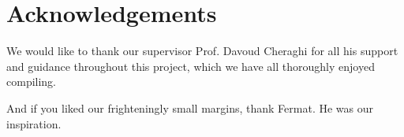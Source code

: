\documentclass[../main.tex]{subfiles}
\begin{document}
\section{Acknowledgements}
\label{sec:ack}

We would like to thank our supervisor Prof. Davoud Cheraghi for all his support and guidance throughout this project, which we have all thoroughly enjoyed compiling.

And if you liked our frighteningly small margins, thank Fermat. He was our inspiration.

\end{document}
